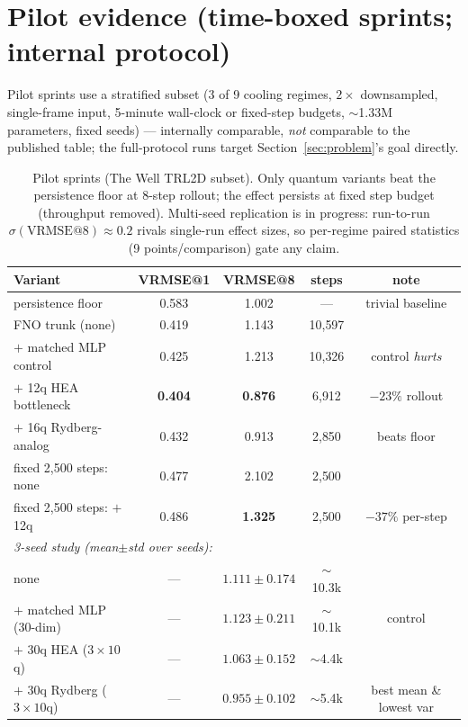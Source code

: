 \documentclass{article}
\begin{document}
\section{Pilot evidence (time-boxed sprints; internal protocol)}
\label{sec:pilot}

Pilot sprints use a stratified subset (3 of 9 cooling regimes, $2\times$
downsampled, single-frame input, 5-minute wall-clock or fixed-step budgets,
$\sim$1.33M parameters, fixed seeds) --- internally comparable, \emph{not}
comparable to the published table; the full-protocol runs target
Section~\ref{sec:problem}'s goal directly.

\begin{table}[h]
\centering
\small
\begin{tabular}{lcccc}
\toprule
Variant & VRMSE@1 & VRMSE@8 & steps & note \\
\midrule
persistence floor & 0.583 & 1.002 & --- & trivial baseline \\
FNO trunk (none) & 0.419 & 1.143 & 10{,}597 & \\
$+$ matched MLP control & 0.425 & 1.213 & 10{,}326 & control \emph{hurts} \\
$+$ 12q HEA bottleneck & \textbf{0.404} & \textbf{0.876} & 6{,}912 & $-23\%$ rollout \\
$+$ 16q Rydberg-analog & 0.432 & 0.913 & 2{,}850 & beats floor \\
\midrule
fixed 2{,}500 steps: none & 0.477 & 2.102 & 2{,}500 & \\
fixed 2{,}500 steps: $+$12q & 0.486 & \textbf{1.325} & 2{,}500 & $-37\%$ per-step \\
\midrule
\multicolumn{5}{l}{\emph{3-seed study (mean$\pm$std over seeds):}} \\
none & --- & $1.111 \pm 0.174$ & $\sim$10.3k & \\
$+$ matched MLP (30-dim) & --- & $1.123 \pm 0.211$ & $\sim$10.1k & control \\
$+$ 30q HEA ($3{\times}10$q) & --- & $1.063 \pm 0.152$ & $\sim$4.4k & \\
$+$ 30q Rydberg ($3{\times}10$q) & --- & $\mathbf{0.955 \pm 0.102}$ & $\sim$5.4k & best mean \& lowest var \\
\bottomrule
\end{tabular}
\vspace{2pt}
\caption{Pilot sprints (The Well TRL2D subset). Only quantum variants beat
the persistence floor at 8-step rollout; the effect persists at fixed step
budget (throughput removed). Multi-seed replication is in progress: run-to-run
$\sigma(\mathrm{VRMSE@8}) \approx 0.2$ rivals single-run effect sizes, so
per-regime paired statistics (9 points/comparison) gate any claim.}
\label{tab:pilot}
\end{table}
\end{document}
